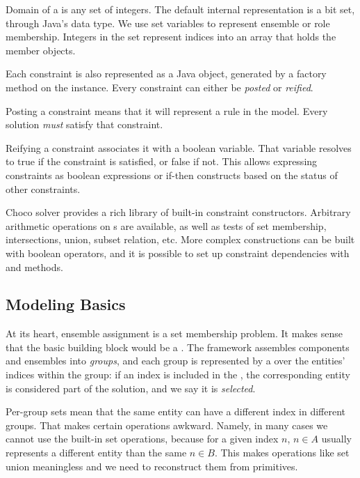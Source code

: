 Domain of a  is any set of integers. The default internal representation is a
bit set, through Java's  data type. We use set variables to represent
ensemble or role membership. Integers in the set represent indices into an array that
holds the member objects.

\medskip

Each constraint is also represented as a Java object, generated by a factory method on
the  instance. Every constraint can either be \textit{posted} or
\textit{reified}.

Posting a constraint means that it will represent a rule in the model. Every solution
\textit{must} satisfy that constraint.

Reifying a constraint associates it with a boolean variable. That variable resolves to
true if the constraint is satisfied, or false if not. This allows expressing constraints
as boolean expressions or if-then constructs based on the status of other constraints.

Choco solver provides a rich library of built-in constraint constructors. Arbitrary
arithmetic operations on s are available, as well as tests of set
membership, intersections, union, subset relation, etc. More complex constructions can
be built with boolean operators, and it is possible to set up constraint dependencies
with  and  methods.


\subsection{Modeling Basics}

At its heart, ensemble assignment is a set membership problem. It makes sense that the
basic building block would be a . The framework assembles components and
ensembles into \textit{groups}, and each group is represented by a  over the
entities' indices within the group: if an index is included in the , the
corresponding entity is considered part of the solution, and we say it is
\textit{selected}.

Per-group sets mean that the same entity can have a different index in different groups.
That makes certain operations awkward. Namely, in many cases we cannot use the built-in
set operations, because for a given index $n$, $n \in A$ usually represents a different
entity than the same $n \in B$. This makes operations like set union meaningless and we
need to reconstruct them from primitives.

